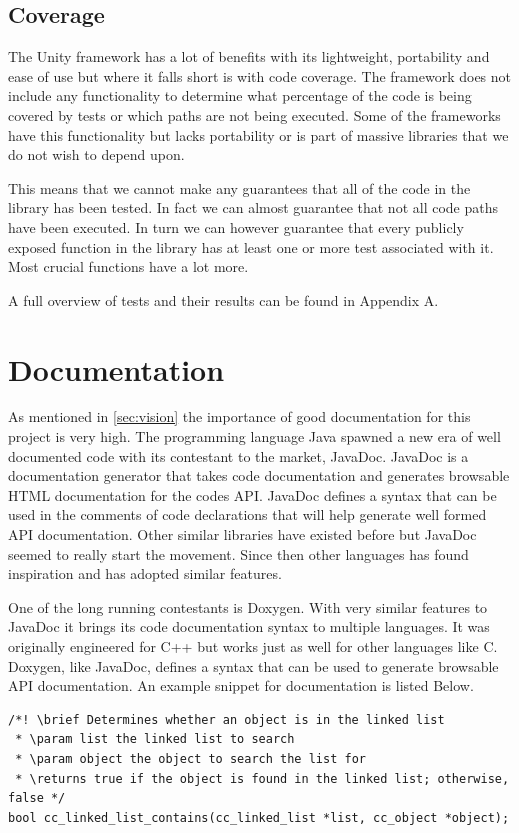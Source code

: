 \documentclass[table]{ituthesis}
\begin{document}
	\subsection{Coverage}
	
	The Unity framework has a lot of benefits with its lightweight, portability and ease of use but where it falls short is with code coverage. The framework does not include any functionality to determine what percentage of the code is being covered by tests or which paths are not being executed. Some of the frameworks have this functionality but lacks portability or is part of massive libraries that we do not wish to depend upon.

	This means that we cannot make any guarantees that all of the code in the library has been tested. In fact we can almost guarantee that not all code paths have been executed. In turn we can however guarantee that every publicly exposed function in the library has at least one or more test associated with it. Most crucial functions have a lot more.

	A full overview of tests and their results can be found in Appendix A.
	
\section{Documentation}

As mentioned in \autoref{sec:vision} the importance of good documentation for this project is very high. The programming language Java spawned a new era of well documented code with its contestant to the market, JavaDoc. JavaDoc is a documentation generator that takes code documentation and generates browsable HTML documentation for the codes API. JavaDoc defines a syntax that can be used in the comments of code declarations that will help generate well formed API documentation. Other similar libraries have existed before but JavaDoc seemed to really start the movement. Since then other languages has found inspiration and has adopted similar features.

One of the long running contestants is Doxygen. With very similar features to JavaDoc it brings its code documentation syntax to multiple languages. It was originally engineered for C++ but works just as well for other languages like C. Doxygen, like JavaDoc, defines a syntax that can be used to generate browsable API documentation. An example snippet for documentation is listed Below.


\begin{lstlisting}[label=documentation-example,caption=Example of Doxygen comment]
/*! \brief Determines whether an object is in the linked list
 * \param list the linked list to search
 * \param object the object to search the list for
 * \returns true if the object is found in the linked list; otherwise, false */
bool cc_linked_list_contains(cc_linked_list *list, cc_object *object);
\end{lstlisting}
\end{document}
